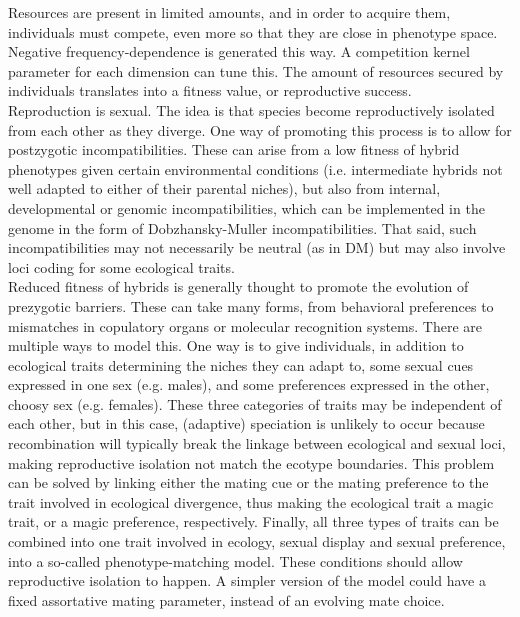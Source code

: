 \documentclass[]{article}
\begin{document}
Resources are present in limited amounts, and in order to acquire them, individuals must compete, even more so that they are close in phenotype space. Negative frequency-dependence is generated this way. A competition kernel parameter for each dimension can tune this. The amount of resources secured by individuals translates into a fitness value, or reproductive success.\\

Reproduction is sexual. The idea is that species become reproductively isolated from each other as they diverge. One way of promoting this process is to allow for postzygotic incompatibilities. These can arise from a low fitness of hybrid phenotypes given certain environmental conditions (i.e. intermediate hybrids not well adapted to either of their parental niches), but also from internal, developmental or genomic incompatibilities, which can be implemented in the genome in the form of Dobzhansky-Muller incompatibilities. That said, such incompatibilities may not necessarily be neutral (as in DM) but may also involve loci coding for some ecological traits.\\

Reduced fitness of hybrids is generally thought to promote the evolution of prezygotic barriers. These can take many forms, from behavioral preferences to mismatches in copulatory organs or molecular recognition systems. There are multiple ways to model this. One way is to give individuals, in addition to ecological traits determining the niches they can adapt to, some sexual cues expressed in one sex (e.g. males), and some preferences expressed in the other, choosy sex (e.g. females). These three categories of traits may be independent of each other, but in this case, (adaptive) speciation is unlikely to occur because recombination will typically break the linkage between ecological and sexual loci, making reproductive isolation not match the ecotype boundaries. This problem can be solved by linking either the mating cue or the mating preference to the trait involved in ecological divergence, thus making the ecological trait a magic trait, or a magic preference, respectively. Finally, all three types of traits can be combined into one trait involved in ecology, sexual display and sexual preference, into a so-called phenotype-matching model. These conditions should allow reproductive isolation to happen. A simpler version of the model could have a fixed assortative mating parameter, instead of an evolving mate choice.\\
\end{document}
